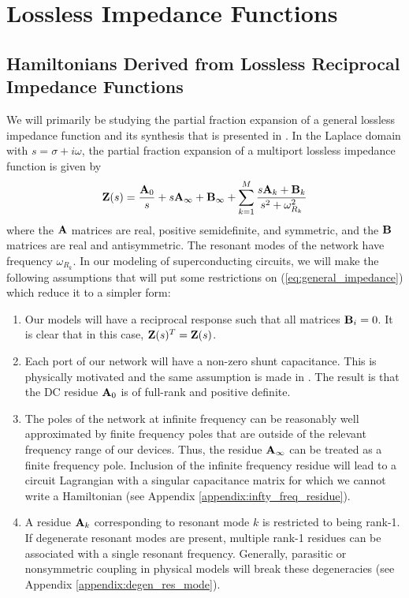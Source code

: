 \newpage
\section{Lossless Impedance Functions}
\subsection{Hamiltonians Derived from Lossless Reciprocal Impedance Functions}\label{section:impedance_hamiltonian}

We will primarily be studying the partial fraction expansion of a general lossless impedance function and its synthesis that is presented in \cite[Chapter 7]{newcomb}. In the Laplace domain with $s=\sigma+i\omega$, the partial fraction expansion of a multiport lossless impedance function is given by
\begin{equation}\label{eq:general_impedance}
    \vb{Z}(s) = \frac{\vb{A}_0}{s} + s\vb{A}_\infty + \vb{B}_\infty + \sum_{k=1}^{M} \frac{s\vb{A}_k + \vb{B}_k}{s^2 + \omega_{R_k}^2}
\end{equation}
where the $\vb{A}$ matrices are real, positive semidefinite, and symmetric, and the $\vb{B}$ matrices are real and antisymmetric. The resonant modes of the network have frequency $\omega_{R_k}$. In our modeling of superconducting circuits, we will make the following assumptions that will put some restrictions on (\ref{eq:general_impedance}) which reduce it to a simpler form:
\begin{enumerate}
    \item Our models will have a reciprocal response such that all matrices $\vb{B}_i = 0$. It is clear that in this case, $\vb{Z}(s)^T=\vb{Z}(s)$.
    \item Each port of our network will have a non-zero shunt capacitance. This is physically motivated and the same assumption is made in \cite{solgun_sirf,sherbrooke_sirf}. The result is that the DC residue $\vb{A}_0$ is of full-rank and positive definite.
    \item The poles of the network at infinite frequency can be reasonably well approximated by finite frequency poles that are outside of the relevant frequency range of our devices. Thus, the residue $\vb{A}_\infty$ can be treated as a finite frequency pole. Inclusion of the infinite frequency residue will lead to a circuit Lagrangian with a singular capacitance matrix for which we cannot write a Hamiltonian (see Appendix \ref{appendix:infty_freq_residue}).
    \item A residue $\vb{A}_k$ corresponding to resonant mode $k$ is restricted to being rank-1. If degenerate resonant modes are present, multiple rank-1 residues can be associated with a single resonant frequency. Generally, parasitic or nonsymmetric coupling in physical models will break these degeneracies (see Appendix \ref{appendix:degen_res_mode}).
\end{enumerate}
